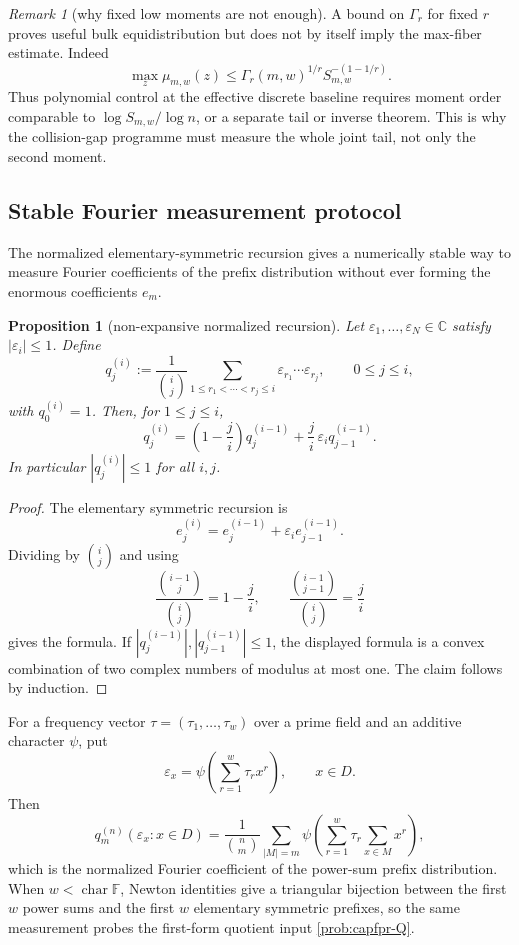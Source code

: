 \documentclass[11pt]{article}
\newtheorem{proposition}[proposition]{Proposition}
\theoremstyle{definition}
\theoremstyle{remark}
\newtheorem{remark}[remark]{Remark}
\newcommand{\F}{\mathbb{F}}
\begin{document}
\begin{remark}[why fixed low moments are not enough]\label{rem:capfpr-low-moments}
A bound on $\Gamma_r$ for fixed $r$ proves useful bulk equidistribution but does
not by itself imply the max-fiber estimate.  Indeed
\[
        \max_z\mu_{m,w}(z)
        \le \Gamma_r(m,w)^{1/r}S_{m,w}^{-(1-1/r)}.
\]
Thus polynomial control at the effective discrete baseline requires moment
order comparable to $\log S_{m,w}/\log n$, or a separate tail or inverse
theorem.  This is why the collision-gap programme must measure the whole joint
tail, not only the second moment.
\end{remark}

\subsection{Stable Fourier measurement protocol}\label{subsec:capfpr-normalized-recursion}

The normalized elementary-symmetric recursion gives a numerically stable way to measure Fourier coefficients of the prefix distribution without ever forming the enormous coefficients $e_m$.

\begin{proposition}[non-expansive normalized recursion]\label{prop:capfpr-normalized-recursion}
Let $\varepsilon_1,\ldots,\varepsilon_N\in\mathbb C$ satisfy $|\varepsilon_i|\le1$.  Define
\[
        q_j^{(i)}
        := \frac{1}{\binom i j}
           \sum_{1\le r_1<\cdots<r_j\le i}
           \varepsilon_{r_1}\cdots\varepsilon_{r_j},
        \qquad 0\le j\le i,
\]
with $q_0^{(i)}=1$.  Then, for $1\le j\le i$,
\[
        q_j^{(i)}=
        \left(1-\frac{j}{i}\right)q_j^{(i-1)}
        +\frac{j}{i}\,\varepsilon_i q_{j-1}^{(i-1)}.
\]
In particular $|q_j^{(i)}|\le1$ for all $i,j$.
\end{proposition}

\begin{proof}
The elementary symmetric recursion is
\[
        e_j^{(i)}=e_j^{(i-1)}+\varepsilon_i e_{j-1}^{(i-1)}.
\]
Dividing by $\binom i j$ and using
\[
        \frac{\binom{i-1}{j}}{\binom{i}{j}}=1-\frac{j}{i},
        \qquad
        \frac{\binom{i-1}{j-1}}{\binom{i}{j}}=\frac{j}{i}
\]
gives the formula.  If $|q_j^{(i-1)}|,|q_{j-1}^{(i-1)}|\le1$, the displayed formula is a convex combination of two complex numbers of modulus at most one.  The claim follows by induction.
\end{proof}

For a frequency vector $\tau=(\tau_1,\ldots,\tau_w)$ over a prime field and an additive character $\psi$, put
\[
        \varepsilon_x=\psi\!\left(\sum_{r=1}^{w}\tau_r x^r\right),
        \qquad x\in D.
\]
Then
\[
        q_m^{(n)}(\varepsilon_x:x\in D)
        =\frac{1}{\binom n m}\sum_{|M|=m}\psi\!\left(\sum_{r=1}^{w}\tau_r\sum_{x\in M}x^r\right),
\]
which is the normalized Fourier coefficient of the power-sum prefix distribution.  When $w<\operatorname{char}\F$, Newton identities give a triangular bijection between the first $w$ power sums and the first $w$ elementary symmetric prefixes, so the same measurement probes the first-form quotient input \cref{prob:capfpr-Q}.
\end{document}
